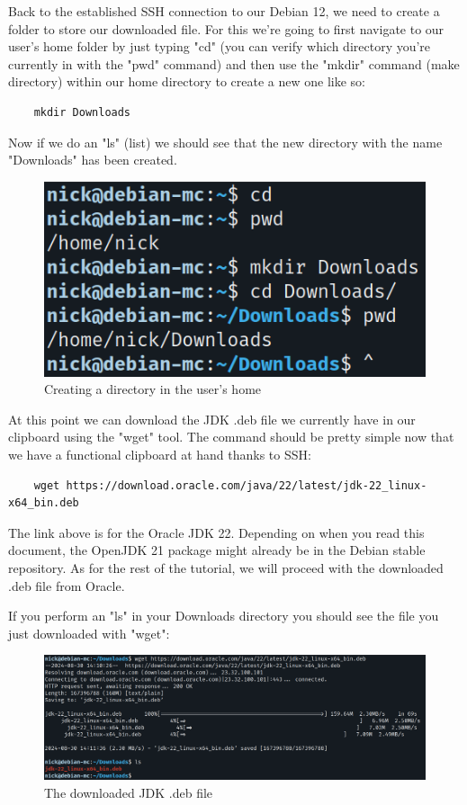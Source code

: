 \documentclass[]{article}
\begin{document}
Back to the established SSH connection to our Debian 12, we need to create a folder to store our downloaded file. For this we're going to first navigate to our user's home folder by just typing "cd" (you can verify which directory you're currently in with the "pwd" command) and then use the "mkdir" command (make directory) within our home directory to create a new one like so:

\begin{verbatim}
	mkdir Downloads
\end{verbatim}

Now if we do an "ls" (list) we should see that the new directory with the name "Downloads" has been created.

\begin{figure}[h!]
	\caption{Creating a directory in the user's home}
	\centering
	\includegraphics[width=1\textwidth]{downloads}
\end{figure}
\FloatBarrier

At this point we can download the JDK .deb file we currently have in our clipboard using the "wget" tool. The command should be pretty simple now that we have a functional clipboard at hand thanks to SSH:

\begin{verbatim}
	wget https://download.oracle.com/java/22/latest/jdk-22_linux-x64_bin.deb
\end{verbatim}

The link above is for the Oracle JDK 22. Depending on when you read this document, the OpenJDK 21 package might already be in the Debian stable repository. As for the rest of the tutorial, we will proceed with the downloaded .deb file from Oracle.

If you perform an "ls" in your Downloads directory you should see the file you just downloaded with "wget":

\begin{figure}[h!]
	\caption{The downloaded JDK .deb file}
	\centering
	\includegraphics[width=1\textwidth]{wget}
\end{figure}
\FloatBarrier
\end{document}
